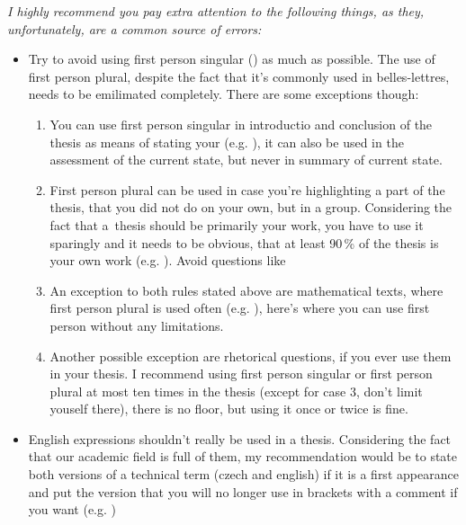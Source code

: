 {{\it I highly recommend you pay extra attention to the following things, as they, unfortunately, are a common source of errors:
\begin{itemize}
  \item{Try to avoid using first person singular () as much as possible. The use of first person plural, despite the fact that it's commonly used in belles-lettres, needs to be emilimated completely. There are some exceptions though:
    \begin{enumerate}
      \item{You can use first person singular in introductio and conclusion of the thesis as means of stating your  (e.g. ), it can also be used in the assessment of the current state, but never in summary of current state.}
      \item{First person plural can be used in case you're highlighting a part of the thesis, that you did not do on your own, but in a group. Considering the fact that a~thesis should be primarily your work, you have to use it sparingly and it needs to be obvious, that at least 90\,\% of the thesis is your own work (e.g. ). Avoid questions like }
      \item{An exception to both rules stated above are mathematical texts, where first person plural is used often (e.g. ), here's where you can use first person without any limitations.}
      \item{Another possible exception are rhetorical questions, if you ever use them in your thesis. I  recommend using first person singular or first person plural at most ten times in the thesis (except for case 3, don't limit youself there), there is no floor, but using it once or twice is fine.}
    \end{enumerate}}
  \item{English expressions shouldn't really be used in a thesis. Considering the fact that our academic field is full of them, my recommendation would be to state both versions of a technical term (czech and english) if it is a first appearance and put the version that you will no longer use in brackets with a comment if you want (e.g. )}

\end{itemize}}}
